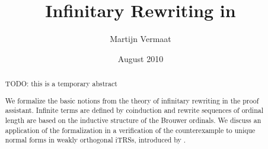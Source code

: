 \documentclass[twoside,openright,draft]{vu}
\title{Infinitary Rewriting in \Coq}
\author{Martijn Vermaat}
\date{August 2010}
\begin{document}
\makefrontmatter
\maketitle

\begin{abstract}
  TODO: this is a temporary abstract

  We formalize the basic notions from the theory of infinitary
  rewriting in the \Coq proof assistant. Infinite terms are defined by
  coinduction and rewrite sequences of ordinal length are based on the
  inductive structure of the Brouwer ordinals. We discuss an
  application of the formalization in a verification of the
  counterexample to unique normal forms in weakly orthogonal iTRSs,
  introduced by \citet{endrullis-10}.
\end{abstract}



\tableofcontents







\appendix



\nocite{*}

\end{document}
